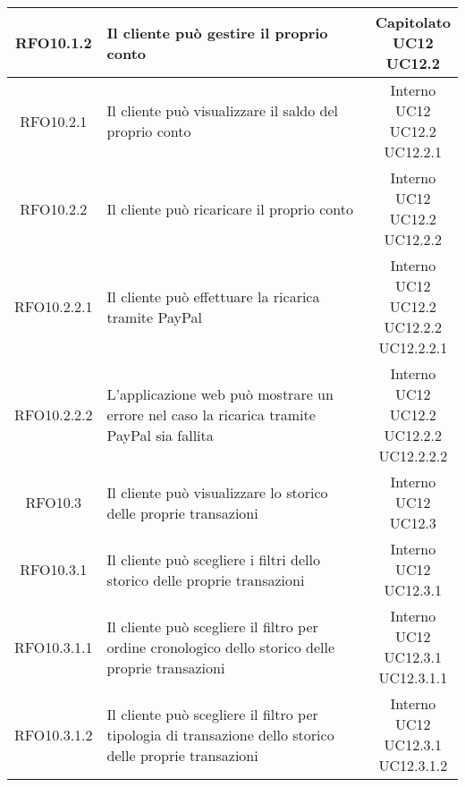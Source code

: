 \begin{longtable}{|c|p{8cm}|c|}
\hypertarget{RFO10.2}{RFO10.1.2} & Il cliente può gestire il proprio conto &\makecell*{Capitolato\\UC12\\UC12.2} \\
\hline

\hypertarget{RFO10.2.1}{RFO10.2.1} & Il cliente può visualizzare il saldo del proprio conto & \makecell*{Interno\\UC12\\UC12.2\\UC12.2.1} \\
\hline
\hypertarget{RFO10.2.2}{RFO10.2.2} & Il cliente può ricaricare il proprio conto & \makecell*{Interno\\UC12\\UC12.2\\UC12.2.2} \\
\hline

\hypertarget{RFO10.2.2.1}{RFO10.2.2.1} & Il cliente può effettuare la ricarica tramite PayPal & \makecell*{Interno\\UC12\\UC12.2\\UC12.2.2\\UC12.2.2.1} \\
\hline

\hypertarget{RFO10.2.2.2}{RFO10.2.2.2} & L'applicazione web può mostrare un errore nel caso la ricarica tramite PayPal sia fallita & \makecell*{Interno\\UC12\\UC12.2\\UC12.2.2\\UC12.2.2.2} \\
\hline

\hypertarget{RFO10.3}{RFO10.3} & Il cliente può visualizzare lo storico delle proprie transazioni & \makecell*{Interno\\UC12\\UC12.3} \\
\hline

\hypertarget{RFO10.3.1}{RFO10.3.1} & Il cliente può scegliere i filtri dello storico delle proprie transazioni & \makecell*{Interno\\UC12\\UC12.3.1} \\
\hline

\hypertarget{RFO10.3.1.1}{RFO10.3.1.1} & Il cliente può scegliere il filtro per ordine cronologico dello storico delle proprie transazioni & \makecell*{Interno\\UC12\\UC12.3.1\\UC12.3.1.1} \\
\hline
\hypertarget{RFO10.3.1.2}{RFO10.3.1.2} & Il cliente può scegliere il filtro per tipologia di transazione dello storico delle proprie transazioni & \makecell*{Interno\\UC12\\UC12.3.1\\UC12.3.1.2} \\
\hline


\end{longtable}
